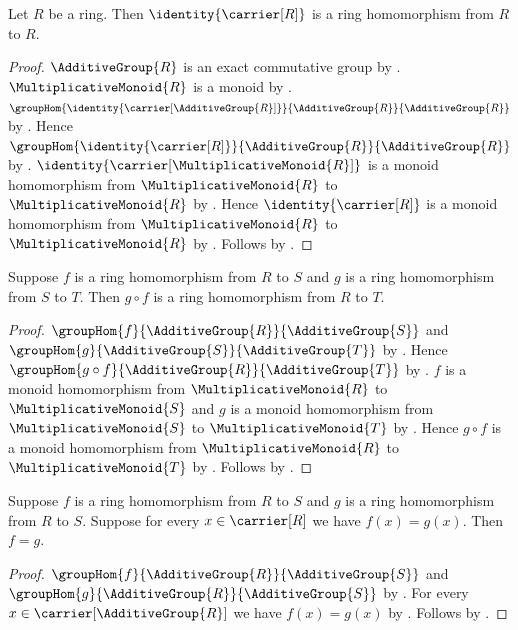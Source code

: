 \begin{proposition}\label{identity_ring_hom}
    Let $R$ be a ring.
    Then $\identity{\carrier[R]}$ is a ring homomorphism from $R$ to $R$.
\end{proposition}
\begin{proof}
    $\AdditiveGroup{R}$ is an exact commutative group by
        .
    $\MultiplicativeMonoid{R}$ is a monoid by
        .
    $\groupHom{\identity{\carrier[\AdditiveGroup{R}]}}{
        \AdditiveGroup{R}}{\AdditiveGroup{R}}$ by
        .
    Hence $\groupHom{\identity{\carrier[R]}}{
        \AdditiveGroup{R}}{\AdditiveGroup{R}}$ by
        .
    $\identity{\carrier[\MultiplicativeMonoid{R}]}$
        is a monoid homomorphism from $\MultiplicativeMonoid{R}$ to
        $\MultiplicativeMonoid{R}$ by
        .
    Hence $\identity{\carrier[R]}$ is a monoid homomorphism from
        $\MultiplicativeMonoid{R}$ to $\MultiplicativeMonoid{R}$ by
        .
    Follows by .
\end{proof}

\begin{theorem}\label{ring_hom_composition}
    Suppose $f$ is a ring homomorphism from $R$ to $S$ and
        $g$ is a ring homomorphism from $S$ to $T$.
    Then $g\circ f$ is a ring homomorphism from $R$ to $T$.
\end{theorem}
\begin{proof}
    $\groupHom{f}{\AdditiveGroup{R}}{\AdditiveGroup{S}}$ and
        $\groupHom{g}{\AdditiveGroup{S}}{\AdditiveGroup{T}}$ by
        .
    Hence $\groupHom{g\circ f}{\AdditiveGroup{R}}{
        \AdditiveGroup{T}}$ by .
    $f$ is a monoid homomorphism from $\MultiplicativeMonoid{R}$ to
        $\MultiplicativeMonoid{S}$ and
        $g$ is a monoid homomorphism from $\MultiplicativeMonoid{S}$ to
        $\MultiplicativeMonoid{T}$ by
        .
    Hence $g\circ f$ is a monoid homomorphism from
        $\MultiplicativeMonoid{R}$ to $\MultiplicativeMonoid{T}$ by
        .
    Follows by .
\end{proof}

\begin{theorem}\label{ring_hom_extensionality}
    Suppose $f$ is a ring homomorphism from $R$ to $S$ and
        $g$ is a ring homomorphism from $R$ to $S$.
    Suppose for every $x\in\carrier[R]$ we have $f(x)=g(x)$.
    Then $f=g$.
\end{theorem}
\begin{proof}
    $\groupHom{f}{\AdditiveGroup{R}}{\AdditiveGroup{S}}$ and
        $\groupHom{g}{\AdditiveGroup{R}}{\AdditiveGroup{S}}$ by
        .
    For every $x\in\carrier[\AdditiveGroup{R}]$ we have
        $f(x)=g(x)$ by .
    Follows by .
\end{proof}

